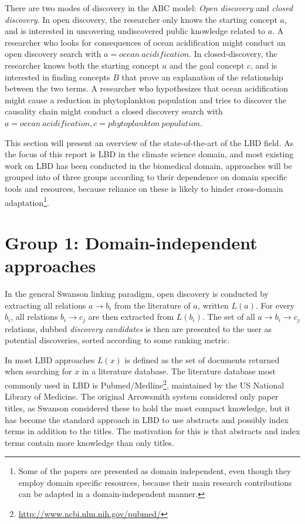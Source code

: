 There are two modes of discovery in the ABC model: \emph{Open discovery} and \emph{closed discovery}. In open discovery, the researcher only knows the starting concept $a$, and is interested in uncovering undiscovered public knowledge related to $a$. A researcher who looks for consequences of ocean acidification might conduct an open discovery search with $a=ocean\ acidification$. In closed-discovery, the researcher knows both the starting concept $a$ and the goal concept $c$, and is interested in finding concepts $B$ that prove an explanation of the relationship between the two terms. A researcher who hypothesizes that ocean acidification might cause a reduction in phytoplankton population and tries to discover the causality chain might conduct a closed discovery search with $a=ocean\ acidification,c=phytoplankton\ population$.

This section will present an overview of the state-of-the-art of the LBD field. As the focus of this report is LBD in the climate science domain, and most existing work on LBD has been conducted in the biomedical domain, approaches will be grouped into of three groups according to their dependence on domain specific tools and resources, because reliance on these is likely to hinder cross-domain adaptation\footnote{Some of the papers are presented as domain independent, even though they employ domain specific resources, because their main research contributions can be adapted in a domain-independent manner.}.

\section{Group 1: Domain-independent approaches}

In the general Swanson linking paradigm, open discovery is conducted by extracting all relations $a \to b_i$ from the literature of $a$, written $L(a)$. For every $b_i$, all relations $b_i \to c_j$ are then extracted from $L(b_i)$. The set of all $a \to b_i \to c_j$ relations, dubbed \emph{discovery candidates} is then are presented to the user as potential discoveries, sorted according to some ranking metric.

In most LBD approaches $L(x)$ is defined as the set of documents returned when searching for $x$ in a literature database. The literature database most commonly used in LBD is Pubmed/Medline\footnote{\url{http://www.ncbi.nlm.nih.gov/pubmed/}}, maintained by the US National Library of Medicine. The original Arrowsmith system considered only paper titles, as Swanson considered these to hold the most compact knowledge, but it has become the standard approach in LBD to use abstracts and possibly index terms in addition to the titles. The motivation for this is that abstracts and index terms contain more knowledge than only titles. 

